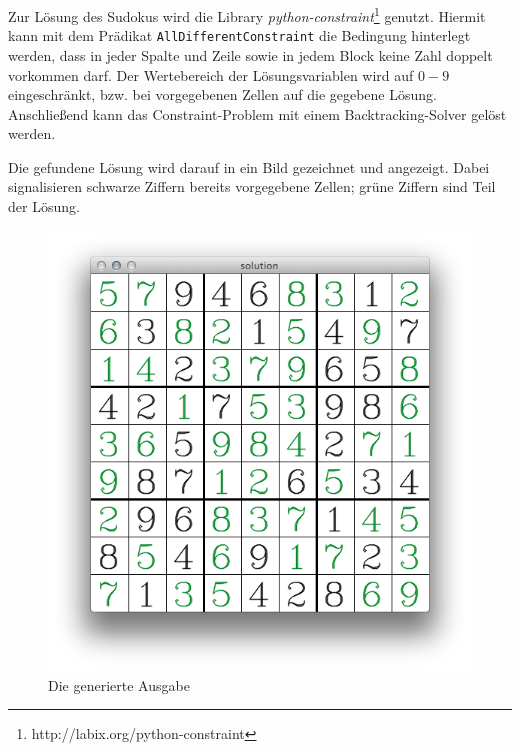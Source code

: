 Zur Lösung des Sudokus wird die Library \emph{python-constraint}\footnote{http://labix.org/python-constraint} genutzt. Hiermit kann mit dem Prädikat \lstinline{AllDifferentConstraint} die Bedingung hinterlegt werden, dass in jeder Spalte und Zeile sowie in jedem Block keine Zahl doppelt vorkommen darf. Der Wertebereich der Lösungsvariablen wird auf $0-9$ eingeschränkt, bzw. bei vorgegebenen Zellen auf die gegebene Lösung.
Anschließend kann das Constraint-Problem mit einem Backtracking-Solver gelöst werden.

Die gefundene Lösung wird darauf in ein Bild gezeichnet und angezeigt.
Dabei signalisieren schwarze Ziffern bereits vorgegebene Zellen; grüne Ziffern sind Teil der Lösung.

\begin{figure}[H]
    \begin{center}
        \includegraphics[width=.5\textwidth]{Abbildungen/solution}
    \end{center}
    \caption{Die generierte Ausgabe}
\end{figure}
